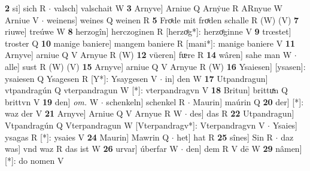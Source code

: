 \documentclass[8pt,a4paper,notitlepage]{article}
\begin{document}
\begin{table}[ht]
\begin{minipage}[t]{0.5\linewidth}
\textbf{2} si] sich R  $\cdot$ valsch] valschait W \textbf{3} Arnyve] Arniue Q Arnẏue R ARnyue W Arniue V  $\cdot$ weinens] weines Q weinen R \textbf{5} Froͯde mit froͯden schalle R (W) (V) \textbf{7} riuwe] treúwe W \textbf{8} herzogîn] herczoginen R [herzoͤg*]: herzoͤginne V \textbf{9} trœstet] troster Q \textbf{10} manige baniere] mangem baniere R [mani*]: manige baniere V \textbf{11} Arnyve] arniue Q V Arnyue R (W) \textbf{12} vüeren] fᵫre R \textbf{14} wâren] sahe man W  $\cdot$ alle] sust R (W) (V) \textbf{15} Arnyve] arniue Q V Arnyue R (W) \textbf{16} Ysaiesen] [ysasen]: ysaiesen Q Ysagesen R [Y*]: Ysaygesen V  $\cdot$ in] den W \textbf{17} Utpandragun] vtpandragún Q vterpandragun W [*]: vterpandragvn V \textbf{18} Britun] brittuͯn Q brittvn V \textbf{19} den] \textit{om.} W  $\cdot$ schenkeln] schenkel R  $\cdot$ Maurin] maúrin Q \textbf{20} der] [*]: waz der V \textbf{21} Arnyve] Arniue Q V Arnyue R W  $\cdot$ des] das R \textbf{22} Utpandragun] Vtpandragún Q Vterpandragun W [Vterpandragv*]: Vterpandragvn V  $\cdot$ Ysaies] ysagas R [*]: ysaies V \textbf{24} Maurin] Mawrin Q  $\cdot$ het] hat R \textbf{25} sînes] Sin R  $\cdot$ daz was] vnd waz R das ist W \textbf{26} urvar] úberfar W  $\cdot$ den] dem R V dē W \textbf{29} nâmen] [*]: do nomen V \newline
\end{minipage}
\end{table}
\end{document}
